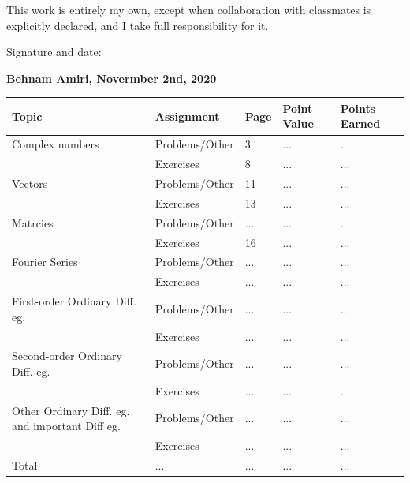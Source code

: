 \documentclass[fleqn]{article}
\begin{document}
\bigbreak

\Large This work is entirely my own, except when collaboration with classmates is explicitly declared, and I take full responsibility for it.

\bigbreak

\Large Signature and date:

\bigbreak

\bigbreak


\Large \textbf{ Behnam Amiri, Novermber 2nd, 2020 }


\pagebreak

\begin{singlespace}
  \begin{tabular}{ |p{3cm}|||p{4cm}|p{2cm}|p{2cm}|p{2cm}|  }
      \hline
      Topic & Assignment & Page & Point Value & Points Earned \\
      \hline
      Complex numbers & \cellcolor{orange} Problems/Other & \cellcolor{orange} 3 &\cellcolor{orange}  ... &\cellcolor{orange}  ... \\
      & \cellcolor{orange} Exercises &\cellcolor{orange}  8 &\cellcolor{orange}  ... &\cellcolor{orange}  ... \\
      \hline
      Vectors & Problems/Other & 11 & ... & ... \\
      & Exercises & 13 & ... & ... \\
      \hline
      Matrcies & \cellcolor{orange} Problems/Other &\cellcolor{orange}  ... &\cellcolor{orange}  ... & \cellcolor{orange} ... \\
      & \cellcolor{orange} Exercises &\cellcolor{orange}  16 &\cellcolor{orange}  ... &\cellcolor{orange}  ... \\
      \hline
      Fourier Series & Problems/Other & ... & ... & ... \\
      & Exercises & ... & ... & ... \\
      \hline
      First-order Ordinary Diff. eg.  &\cellcolor{orange} Problems/Other &\cellcolor{orange} ... &\cellcolor{orange} ... &\cellcolor{orange} ... \\
      & \cellcolor{orange} Exercises &\cellcolor{orange}  ... &\cellcolor{orange}  ... &\cellcolor{orange}  ... \\
      \hline
      Second-order Ordinary Diff. eg. & Problems/Other & ...  & ... & ... \\
      & Exercises & ... & ... & ... \\
      \hline
      Other Ordinary Diff. eg. and important Diff eg. &\cellcolor{orange} Problems/Other &\cellcolor{orange} ... & \cellcolor{orange}... & \cellcolor{orange}...  \\ 
      & \cellcolor{orange} Exercises &\cellcolor{orange}  ... &\cellcolor{orange}  ... &\cellcolor{orange}  ... \\ 
      \hline
      Total & ... & ... & ... & ... \\
      \hline
  \end{tabular}
\end{singlespace}
\end{document}
